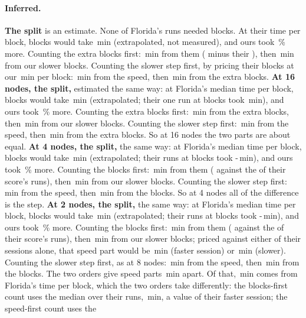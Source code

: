 \paragraph{Inferred.} \textbf{The split} is an estimate. None of Florida's runs needed \TriFxBlocks{} blocks. At their time per block, \TriFxBlocks{} blocks would take \TriFxExtrap\,min (extrapolated, not measured), and ours took \TriFxAboveExtrap\,\% more. Counting the extra blocks first: \TriFxSplitBlocks\,min from them (\TriFxExtrap{} minus their \TriFxFlTttExact), then \TriFxSplitSpeed\,min from our slower blocks. Counting the slower step first, by pricing their \TriFxFlBlocksMean{} blocks at our \TriFxTpb\,min per block: \TriFxSplitSpeedFirst\,min from the speed, then \TriFxSplitBlocksSecond\,min from the extra blocks. \textbf{At 16 nodes, the split,} estimated the same way: at Florida's median time per block, \TriFxSixteenBlocks{} blocks would take \TriFxSixteenExtrap\,min (extrapolated; their one run at \TriFxSixteenBlocks{} blocks took \TriFxSixteenFlSame\,min), and ours took \TriFxSixteenAboveExtrap\,\% more. Counting the extra blocks first: \TriFxSixteenSplitBlocks\,min from the \TriFxSixteenBlocksMore{} extra blocks, then \TriFxSixteenSplitSpeed\,min from our slower blocks. Counting the slower step first: \TriFxSixteenSplitSpeedFirst\,min from the speed, then \TriFxSixteenSplitBlocksSecond\,min from the extra blocks. So at 16 nodes the two parts are about equal. \textbf{At 4 nodes, the split,} the same way: at Florida's median time per block, \TriFxFourBlocks{} blocks would take \TriFxFourExtrap\,min (extrapolated; their \TriFxFourFlSameRuns{} runs at \TriFxFourBlocks{} blocks took \TriFxFourFlSameLo-\TriFxFourFlSameHi\,min), and ours took \TriFxFourAboveExtrap\,\% more. Counting the blocks first: \TriFxFourSplitBlocks\,min from them (\TriFxFourBlocks{} against the \TriFxFourFlBlocksMean{} of their score's runs), then \TriFxFourSplitSpeed\,min from our slower blocks. Counting the slower step first: \TriFxFourSplitSpeedFirst\,min from the speed, then \TriFxFourSplitBlocksSecond\,min from the blocks. So at 4 nodes all of the difference is the step. \textbf{At 2 nodes, the split,} the same way: at Florida's median time per block, \TriFxTwoBlocks{} blocks would take \TriFxTwoExtrap\,min (extrapolated; their \TriFxTwoFlSameRuns{} runs at \TriFxTwoBlocks{} blocks took \TriFxTwoFlSameLo-\TriFxTwoFlSameHi\,min), and ours took \TriFxTwoAboveExtrap\,\% more. Counting the blocks first: \TriFxTwoSplitBlocks\,min from them (\TriFxTwoBlocks{} against the \TriFxTwoFlBlocksMean{} of their score's runs), then \TriFxTwoSplitSpeed\,min from our slower blocks; priced against either of their sessions alone, that speed part would be \TriFxTwoSplitSpeedFast\,min (faster session) or \TriFxTwoSplitSpeedSlow\,min (slower). Counting the slower step first, as at 8 nodes: \TriFxTwoSplitSpeedFirst\,min from the speed, then \TriFxTwoSplitBlocksSecond\,min from the blocks. The two orders give speed parts \TriFxTwoSplitOrderDiff\,min apart. Of that, \TriFxTwoSplitRefPart\,min comes from Florida's time per block, which the two orders take differently: the blocks-first count uses the median over their runs, \TriFxTwoFlTpb\,min, a value of their faster session; the speed-first count uses the 